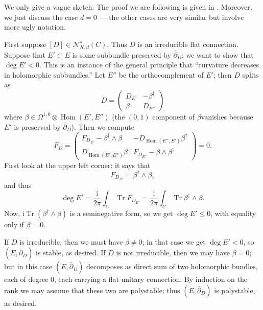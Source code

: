 \documentclass[12pt,letterpaper,reqno]{article}
\numberwithin{equation}{section}
\newcommand{\cN}{\ensuremath{\mathcal N}}
\newcommand{\I}{{\mathrm i}}
\DeclareMathOperator{\Tr}{Tr}
\DeclareMathOperator{\Hom}{Hom}
\begin{document}
\begin{pf} 
We only give a vague sketch.
The proof we are following is given in \cite{MR710055}.
Moreover, we just discuss the case $d=0$ --- the other cases are
very similar but involve more ugly notation.

First suppose $[D] \in \cN^s_{K,d}(C)$. Thus $D$
is an irreducible flat connection. Suppose that $E' \subset E$ is some
subbundle preserved by $\bar\partial_D$; we want to show that $\deg E' < 0$.
This is an instance of the general principle that ``curvature decreases
in holomorphic subbundles.'' 
Let $E''$ be the orthocomplement of $E'$; then $D$ splits as
\begin{equation} \label{eq:connection-split}
  D = \begin{pmatrix} D_{E'} & - \beta^\dagger \\ \beta & D_{E''} \end{pmatrix}
\end{equation}
where $\beta \in \Omega^{1,0} \otimes \Hom(E',E'')$ (the $(0,1)$ component
of $\beta $vanishes because $E'$ is preserved by $\bar\partial_D$). 
Then we compute
\begin{equation} \label{eq:extension-curvature}
  F_D = \begin{pmatrix} F_{D_{E'}} - \beta^\dagger \wedge \beta & - D_{\Hom(E'',E')} \beta^\dagger \\ D_{\Hom(E',E'')} \beta & F_{D_{E''}} - \beta \wedge \beta^\dagger \end{pmatrix} = 0.
\end{equation}
First look at the upper left corner: it says that
\begin{equation}
  F_{D_{E'}} = \beta^\dagger \wedge \beta,
\end{equation}
and thus
\begin{equation}
 \deg E' = \frac{\I}{2 \pi} \int_C \Tr F_{D_{E'}} = \frac{\I}{2 \pi} \int_C \Tr \beta^\dagger \wedge \beta.
\end{equation}
Now, $\I \Tr (\beta^\dagger \wedge \beta)$ is a seminegative form,
so we get $\deg E' \le 0$, with equality only if $\beta = 0$.

If $D$ is irreducible, then
we must have $\beta \neq 0$; in that case we get $\deg E' < 0$,
so $(E,\bar\partial_D)$ is stable, as desired.
If $D$ is not irreducible, then we may have $\beta = 0$;
but in this case $(E,\bar\partial_D)$ decomposes as direct sum
of two holomorphic bundles, each of degree $0$, each carrying a 
flat unitary connection. By induction on the rank we may assume
that these two are polystable; thus 
$(E,\bar\partial_D)$ is polystable, as desired.


\end{pf}
\end{document}
